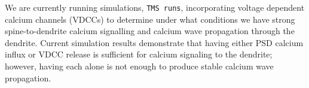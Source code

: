 \documentclass[10pt, letterpaper]{article}
\begin{document}
\begin{table}[h!]
\centering
{}
\caption{SU usage according to project simulations.}
\label{tab:sus}
\end{table}

We are currently running simulations, \texttt{TMS runs}, incorporating voltage dependent calcium channels (VDCCs) to determine under what conditions we have strong spine-to-dendrite calcium signalling and calcium wave propagation through the dendrite. Current simulation results demonstrate that having either PSD calcium influx or VDCC  release is sufficient for calcium signaling to the dendrite; however, having each alone is not enough to produce stable calcium wave propagation.
\end{document}
